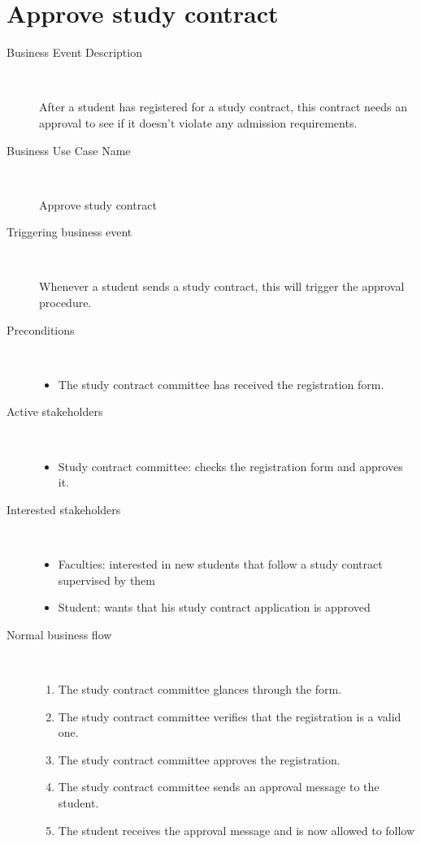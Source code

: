 \section{Approve study contract}

\begin{description}
	\item[Business Event Description] \ 
		\par After a student has registered for a study contract, this contract needs an
		approval to see if it doesn't violate any admission requirements.
	\item[Business Use Case Name] \ 
		\par Approve study contract
	\item[Triggering business event] \ 
		\par Whenever a student sends a study contract, this will trigger the
		approval procedure.
	\item[Preconditions] \
	\begin{itemize}
		\item The study contract committee has received the registration form.
	\end{itemize}
	\item[Active stakeholders] \ 
	\begin{itemize}
		\item Study contract committee: checks the registration form and approves it.
	\end{itemize}
	\item[Interested stakeholders] \ 
		\begin{itemize}
		\item Faculties: interested in new students that follow a study contract supervised
		by them
		\item Student: wants that his study contract application is approved
		\end{itemize}
	\item[Normal business flow] \ 
	\begin{enumerate}
	  	\item The study contract committee glances through the form. 
	  	\item The study contract committee verifies that the registration is a valid
	  	one.
	  	\item The study contract committee approves the registration.
	  	\item The study contract committee sends an approval message to the
	  	student.
	  	\item The student receives the approval message and is now allowed to follow

\end{enumerate}
\end{description}
